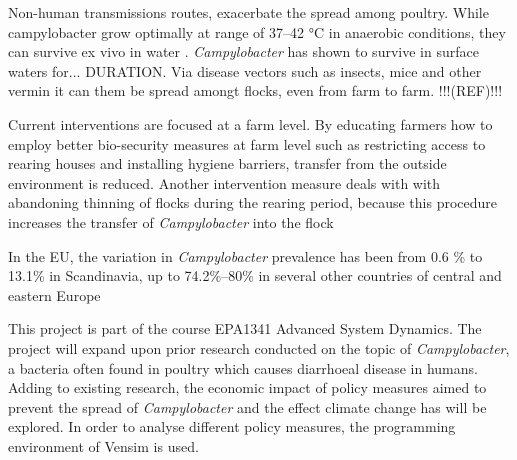 Non-human transmissions routes, exacerbate the spread among poultry. While campylobacter grow optimally at range of 37–42 °C \cite{bronowski_role_2014} in anaerobic conditions, they can survive ex vivo in water \cite{wilson_tracing_2008}. \textit{Campylobacter} has shown to survive in surface waters for... DURATION.
Via disease vectors such as insects, mice and other vermin it can them be spread amongt flocks, even from farm to farm. !!!(REF)!!!


Current interventions are focused at a farm level. By educating farmers how to employ better bio-security measures at farm level such as restricting access to rearing houses and installing hygiene barriers, transfer from the outside environment is reduced. Another intervention measure deals with with abandoning thinning of flocks during the rearing period, because this procedure increases the transfer of \textit{Campylobacter} into the flock
    


In the EU, the variation in \textit{Campylobacter} prevalence has been from 0.6 \% to 13.1\% in Scandinavia, up to 74.2\%–80\% in several other countries of central and eastern Europe \cite{skarp_campylobacteriosis_2015} 
















This project is part of the course EPA1341 Advanced System Dynamics. The project will expand upon prior research conducted on the topic of \textit{Campylobacter}, a bacteria often found in poultry which causes diarrhoeal disease in humans. Adding to existing research, the economic impact of policy measures aimed to prevent the spread of  \textit{Campylobacter} and the effect climate change has will be explored. In order to analyse different policy measures, the programming environment of Vensim is used. 

